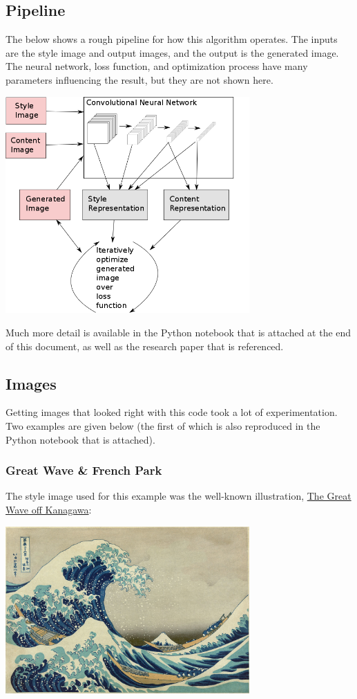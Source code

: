 \documentclass{article}
\begin{document}
\subsection{Pipeline}

The below shows a rough pipeline for how this algorithm operates.  The
inputs are the style image and output images, and the output is the
generated image.  The neural network, loss function, and optimization
process have many parameters influencing the result, but they are not
shown here.

\includegraphics[width=0.7\textwidth]{flowchart.png}

Much more detail is available in the Python notebook that is attached
at the end of this document, as well as the research paper that is
referenced.

\subsection{Images}

Getting images that looked right with this code took a lot of
experimentation. Two examples are given below (the first of which is
also reproduced in the Python notebook that is attached).

\subsubsection{Great Wave \& French Park}

The style image used for this example was the well-known illustration,
\href{https://en.wikipedia.org/wiki/The_Great_Wave_off_Kanagawa}{The
  Great Wave off Kanagawa}:

\includegraphics[width=0.7\textwidth]{./1280px-Great_Wave_off_Kanagawa2b.jpg}
\end{document}
